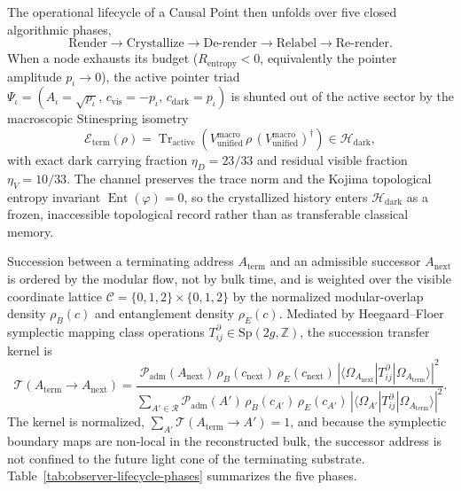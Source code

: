 \documentclass[11pt,letterpaper]{article}
\theoremstyle{plain}
\DeclareMathOperator{\Tr}{Tr}
\newcommand{\Padm}{\mathcal P_{\text{adm}}}
\newcommand{\Rentropy}{R_{\text{entropy}}}
\begin{document}
The operational lifecycle of a Causal Point then unfolds over five closed
algorithmic phases,
\begin{equation}
\label{eq:observer-five-phase-lifecycle}
 \text{Render}
 \longrightarrow
 \text{Crystallize}
 \longrightarrow
 \text{De-render}
 \longrightarrow
 \text{Relabel}
 \longrightarrow
 \text{Re-render}.
\end{equation}
When a node exhausts its budget ($\Rentropy<0$, equivalently the pointer
amplitude $p_\iota\to0$), the active pointer triad
$\Psi_\iota=(A_\iota=\sqrt{p_\iota},\,c_{\text{vis}}=-p_\iota,\,
c_{\text{dark}}=p_\iota)$ is shunted out of the active sector by the
macroscopic Stinespring isometry
\begin{equation}
\label{eq:observer-stinespring-derendering}
 \mathcal E_{\text{term}}(\rho)
 =
 \Tr_{\text{active}}\!\left(
 V_{\text{unified}}^{\text{macro}}\,
 \rho\,
 (V_{\text{unified}}^{\text{macro}})^\dagger
 \right)
 \in\mathcal H_{\text{dark}},
\end{equation}
with exact dark carrying fraction $\eta_D=23/33$ and residual visible fraction
$\eta_V=10/33$.  The channel preserves the trace norm and the Kojima
topological entropy invariant $\operatorname{Ent}(\varphi)=0$, so the
crystallized history enters $\mathcal H_{\text{dark}}$ as a frozen,
inaccessible topological record rather than as transferable classical memory.

Succession between a terminating address $A_{\text{term}}$ and an admissible
successor $A_{\text{next}}$ is ordered by the modular flow, not by bulk time,
and is weighted over the visible coordinate lattice
$\mathcal C=\{0,1,2\}\times\{0,1,2\}$ by the normalized modular-overlap
density $\rho_B(c)$ and entanglement density $\rho_E(c)$.  Mediated by
Heegaard--Floer symplectic mapping class operations
$T^\partial_{ij}\in\mathrm{Sp}(2g,\mathbb Z)$, the succession transfer kernel is
\begin{equation}
\label{eq:observer-succession-kernel}
 \boxed{
 \mathcal T(A_{\text{term}}\to A_{\text{next}})
 =
 \frac{
 \Padm(A_{\text{next}})\,
 \rho_B(c_{\text{next}})\,
 \rho_E(c_{\text{next}})\,
 \left|
 \langle\Omega_{A_{\text{next}}}|T^\partial_{ij}|\Omega_{A_{\text{term}}}\rangle
 \right|^2
 }{
 \displaystyle\sum_{A'\in\mathcal R}
 \Padm(A')\,
 \rho_B(c_{A'})\,
 \rho_E(c_{A'})\,
 \left|
 \langle\Omega_{A'}|T^\partial_{ij}|\Omega_{A_{\text{term}}}\rangle
 \right|^2
 }.
 }
\end{equation}
The kernel is normalized,
$\sum_{A'}\mathcal T(A_{\text{term}}\to A')=1$, and because the symplectic
boundary maps are non-local in the reconstructed bulk, the successor address
is not confined to the future light cone of the terminating substrate.
Table~\ref{tab:observer-lifecycle-phases} summarizes the five phases.
\end{document}
